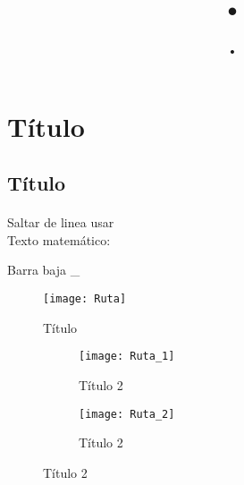\documentclass[a4paper,10pt]{article}
\title{•}
\author{•}
\date{}
\begin{document}
\maketitle

\tableofcontents

\newpage

\section{Título}

\subsection{Título} 

\paragraph{}

Saltar de linea usar \\

Texto matemático:

Barra baja \_

\begin{figure}[H]
    \centering
    \texttt{[image: Ruta]}
    \caption{Título}
    \label{fig:In}
\end{figure}


\begin{figure}[H]
\centering
\begin{subfigure}{.5\textwidth}
  \centering
  \texttt{[image: Ruta\_1]}
  \caption{Título 2}

  \label{fig:sub1}
\end{subfigure}%
\begin{subfigure}{.5\textwidth}
  \centering
  \texttt{[image: Ruta\_2]}
  \caption{Título 2}
  \label{fig:sub2}
\end{subfigure}
\label{fig:test}
\end{figure}
\end{document}

